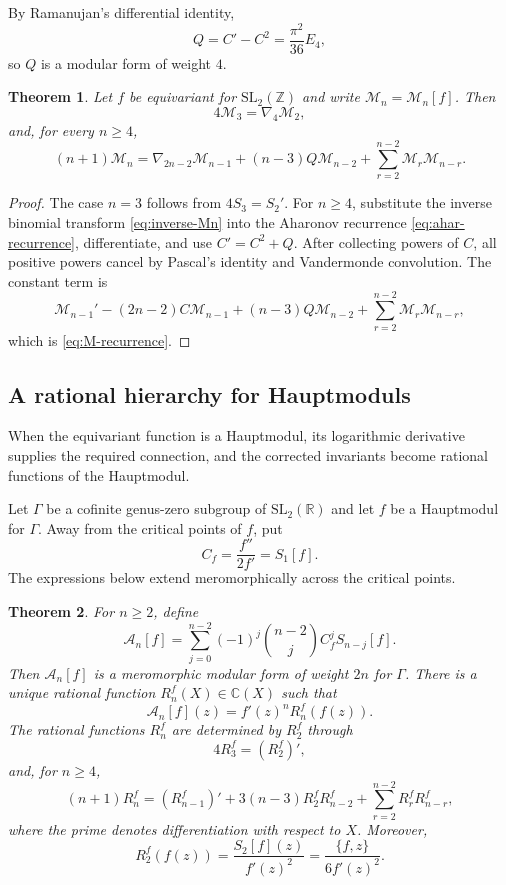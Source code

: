 \documentclass[11pt]{amsart}
\newtheorem{thm}{Theorem}[section]
\theoremstyle{definition}
\theoremstyle{remark}
\numberwithin{equation}{section}
\begin{document}
By Ramanujan's differential identity,
$$ 
Q=C'-C^2=\frac{\pi^2}{36}E_4, 
$$
so \(Q\) is a modular form of weight \(4\).

\begin{thm}\label{thm:modular-recurrence}
Let $f$ be equivariant for $\mathrm{SL}_2(\mathbb Z)$ and write $\mathcal M_n=\mathcal M_n[f]$. Then
\begin{equation}\label{eq:M3-recurrence}
4\mathcal M_3=\nabla_4\mathcal M_2,
\end{equation}
and, for every $n\geq4$,
\begin{equation}\label{eq:M-recurrence}
(n+1)\mathcal M_n
=
\nabla_{2n-2}\mathcal M_{n-1}
+(n-3)Q\mathcal M_{n-2}
+\sum_{r=2}^{n-2}\mathcal M_r\mathcal M_{n-r}.
\end{equation}
\end{thm}

\begin{proof}
The case \(n=3\) follows from \(4S_3=S_2'\). For \(n\ge4\), substitute the inverse binomial transform \eqref{eq:inverse-Mn} into the Aharonov recurrence \eqref{eq:ahar-recurrence}, differentiate, and use \(C'=C^2+Q\). After collecting powers of \(C\), all positive powers cancel by Pascal's identity and Vandermonde convolution. The constant term is
\[
\mathcal M_{n-1}'-(2n-2)C\mathcal M_{n-1}
+(n-3)Q\mathcal M_{n-2}
+\sum_{r=2}^{n-2}\mathcal M_r\mathcal M_{n-r},
\]
which is \eqref{eq:M-recurrence}.
\end{proof}

\subsection{A rational hierarchy for Hauptmoduls}
When the equivariant function is a Hauptmodul, its logarithmic derivative supplies the required connection, and the corrected invariants become rational functions of the Hauptmodul.

Let $\Gamma$ be a cofinite genus-zero subgroup of $\mathrm{SL}_2(\mathbb R)$ and let $f$ be a Hauptmodul for $\Gamma$. Away from the critical points of $f$, put
\[
C_f=\frac{f''}{2f'}=S_1[f].
\]
The expressions below extend meromorphically across the critical points.

\begin{thm}\label{thm:rational-higher-Schwarzian-hierarchy}
For $n\geq2$, define
\[
\mathcal A_n[f]
=
\sum_{j=0}^{n-2}
(-1)^j\binom{n-2}{j}C_f^jS_{n-j}[f].
\]
Then $\mathcal A_n[f]$ is a meromorphic modular form of weight $2n$ for $\Gamma$. There is a unique rational function $R_n^f(X)\in\mathbb C(X)$ such that
\[
\mathcal A_n[f](z)=f'(z)^nR_n^f(f(z)).
\]
The rational functions $R_n^f$ are determined by $R_2^f$ through
\[
4R_3^f=(R_2^f)',
\]
and, for $n\geq4$,
\[
(n+1)R_n^f
=
(R_{n-1}^f)'
+3(n-3)R_2^fR_{n-2}^f
+\sum_{r=2}^{n-2}R_r^fR_{n-r}^f,
\]
where the prime denotes differentiation with respect to $X$. Moreover,
\[
R_2^f(f(z))
=
\frac{S_2[f](z)}{f'(z)^2}
=
\frac{\{f,z\}}{6f'(z)^2}.
\]
\end{thm}
\end{document}
